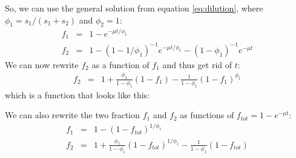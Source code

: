 \documentclass{article}
\begin{document}
So, we can use the general solution from equation \ref{eq:dilution}, where $\phi_1 = s_1 / (s_1 + s_2)$ and $\phi_2 = 1$:
\begin{eqnarray}
    f_1 &=& 1 - e^{- \mu t / \phi_1} \\
    f_2 &=& 1 - \left(1 - 1 / \phi_1 \right)^{-1} e^{- \mu t / \phi_1} - \left(1 - \phi_1 \right)^{-1} e^{- \mu t}
\end{eqnarray}
We can now rewrite $f_2$ as a function of $f_1$ and thus get rid of $t$:
\begin{eqnarray}
    f_2 &=& 1 + \frac{\phi_1}{1-\phi_1} (1 - f_1) - \frac{1}{1-\phi_1} (1 - f_1)^{\phi_1}
\end{eqnarray}
which is a function that looks like this:
\begin{center}
\end{center}

We can also rewrite the two fraction $f_1$ and $f_2$ as functions of $f_{tot} = 1 - e^{- \mu t}$:
\begin{eqnarray}
    f_1 &=& 1 - (1 - f_{tot})^{1/{\phi_1}} \label{eq:two_step_f1_vs_ftot} \nonumber\\
    f_2 &=& 1 + \frac{\phi_1}{1-\phi_1} (1 - f_{tot})^{1/{\phi_1}} - \frac{1}{1-\phi_1} (1 - f_{tot}) \label{eq:two_step_f2_vs_ftot}
\end{eqnarray}
\end{document}
